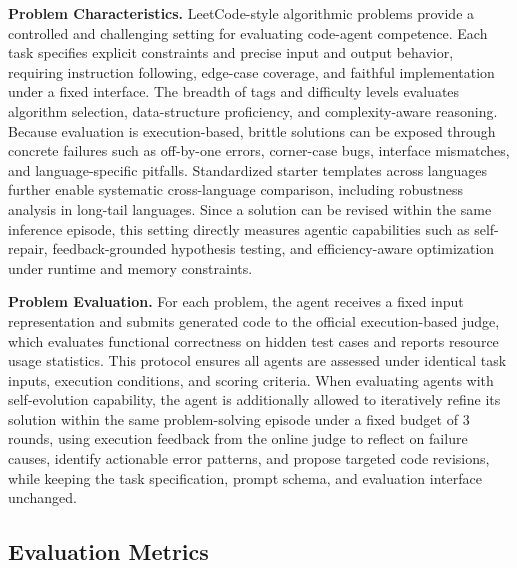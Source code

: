 \textbf{Problem Characteristics.}
LeetCode-style algorithmic problems provide a controlled and challenging setting for evaluating code-agent competence. Each task specifies explicit constraints and precise input and output behavior, requiring instruction following, edge-case coverage, and faithful implementation under a fixed interface. The breadth of tags and difficulty levels evaluates algorithm selection, data-structure proficiency, and complexity-aware reasoning. Because evaluation is execution-based, brittle solutions can be exposed through concrete failures such as off-by-one errors, corner-case bugs, interface mismatches, and language-specific pitfalls. Standardized starter templates across languages further enable systematic cross-language comparison, including robustness analysis in long-tail languages. Since a solution can be revised within the same inference episode, this setting directly measures agentic capabilities such as self-repair, feedback-grounded hypothesis testing, and efficiency-aware optimization under runtime and memory constraints.

\textbf{Problem Evaluation.}
For each problem, the agent receives a fixed input representation and submits generated code to the official execution-based judge, which evaluates functional correctness on hidden test cases and reports resource usage statistics. This protocol ensures all agents are assessed under identical task inputs, execution conditions, and scoring criteria. When evaluating agents with self-evolution capability, the agent is additionally allowed to iteratively refine its solution within the same problem-solving episode under a fixed budget of 3 rounds, using execution feedback from the online judge to reflect on failure causes, identify actionable error patterns, and propose targeted code revisions, while keeping the task specification, prompt schema, and evaluation interface unchanged.

\subsection{Evaluation Metrics}


